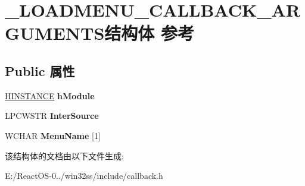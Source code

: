 \hypertarget{struct___l_o_a_d_m_e_n_u___c_a_l_l_b_a_c_k___a_r_g_u_m_e_n_t_s}{}\section{\+\_\+\+L\+O\+A\+D\+M\+E\+N\+U\+\_\+\+C\+A\+L\+L\+B\+A\+C\+K\+\_\+\+A\+R\+G\+U\+M\+E\+N\+T\+S结构体 参考}
\label{struct___l_o_a_d_m_e_n_u___c_a_l_l_b_a_c_k___a_r_g_u_m_e_n_t_s}
\subsection*{Public 属性}
\begin{DoxyCompactItemize}
\item 
\mbox{\label{struct___l_o_a_d_m_e_n_u___c_a_l_l_b_a_c_k___a_r_g_u_m_e_n_t_s_a7e67b02dacc3245247e838942e76311d}} 
\hyperlink{interfacevoid}{H\+I\+N\+S\+T\+A\+N\+CE} {\bfseries h\+Module}
\item 
\mbox{\label{struct___l_o_a_d_m_e_n_u___c_a_l_l_b_a_c_k___a_r_g_u_m_e_n_t_s_a326ca41c553456b38afd7506e42dfb0b}} 
L\+P\+C\+W\+S\+TR {\bfseries Inter\+Source}
\item 
\mbox{\label{struct___l_o_a_d_m_e_n_u___c_a_l_l_b_a_c_k___a_r_g_u_m_e_n_t_s_a5b2a47a4cf5a9a2af2fccfeb3d93fd44}} 
W\+C\+H\+AR {\bfseries Menu\+Name} \mbox{[}1\mbox{]}
\end{DoxyCompactItemize}


该结构体的文档由以下文件生成\+:\begin{DoxyCompactItemize}
\item 
E\+:/\+React\+O\+S-\/0../win32ss/include/callback.\+h\end{DoxyCompactItemize}
